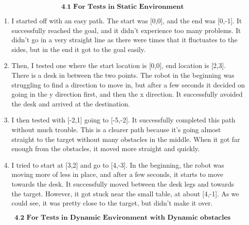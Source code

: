 \documentclass{article}
\begin{document}
$$ \textbf{4.1 For Tests in Static Environment}  $$ 
\begin{enumerate}
    
   \item I started off with an easy path. The start was [0,0], and the end was [0,-1]. It successfully reached the goal, and it didn't experience too many problems. It didn't go in a very straight line as there were times that it fluctuates to the sides, but in the end it got to the goal easily.
    
    \item Then, I tested one where the start location is [0,0], end location is [2,3]. There is a desk in between the two points. The robot in the beginning was struggling to find a direction to move in, but after a few seconds it decided on going in the y direction first, and then the x direction. It successfully avoided the desk and arrived at the destination.

    \item I then tested with [-2,1] going to [-5,-2]. It successfully completed this path without much trouble. This is a clearer path because it's going almost straight to the target without many obstacles in the middle. When it got far enough from the obstacles, it moved more straight and quickly.

    \item I tried to start at [3,2] and go to [4,-3]. In the beginning, the robot was moving more of less in place, and after a few seconds, it starts to move towards the desk. It successfully moved between the desk legs and towards the target. However, it got stuck near the small table, at about [4,-1]. As we could see, it was pretty close to the target, but didn't make it over.
    


\end{enumerate}

$$ \textbf{4.2 For Tests in Dynamic Environment with Dynamic obstacles}  $$ 
\end{document}
